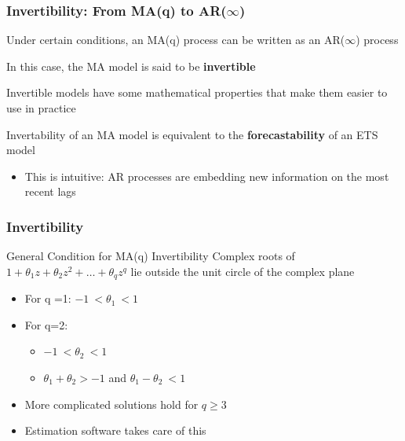 \documentclass{beamer}
\newenvironment{wideitemize}{\itemize\addtolength{\itemsep}{10pt}}{\enditemize}
\begin{document}
\begin{frame}
  \frametitle{Invertibility: From MA(q) to AR($\infty$)}

  \begin{wideitemize}
    \item Under certain conditions, an MA(q) process can be written as an AR($\infty$) process
    \item In this case, the MA model is said to be \textbf{invertible}
    \item Invertible models have some mathematical properties that make them easier to use in practice
    \item Invertability of an MA model is equivalent to the \textbf{forecastability} of an ETS model
      \begin{itemize}
      \item This is intuitive: AR processes are embedding new information on the most recent lags 
      \end{itemize}
  \end{wideitemize}
  
\end{frame}


\begin{frame}
  \frametitle{Invertibility}

  \begin{alertblock}{General Condition for MA(q) Invertibility}
    Complex roots of $1 + \theta_1z + \theta_2 z^2 + \dots + \theta_q z^q$ lie outside the unit circle of the complex plane
  \end{alertblock}

  \smallskip

  \begin{itemize}
  \item For q =1: $-1 \ < \theta_1 \ <1$
  \item For q=2:
    \begin{itemize}
    \item $-1 \ < \theta_2 \ <1$
    \item $\theta_1 + \theta_2 > -1$ and $\theta_1 - \theta_2 \ < 1$
    \end{itemize}
  \item More complicated solutions hold for $q \geq 3$
  \item Estimation software takes care of this
  \end{itemize}
  
\end{frame}
\end{document}
